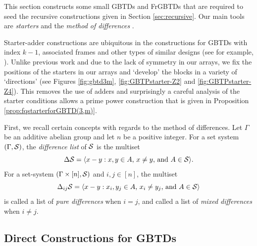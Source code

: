 \documentclass[draft, 11pt]{article}
\begin{document}
This section constructs some small GBTDs and FrGBTDs that are required to seed
the recursive constructions given in Section \ref{sec:recursive}. 
Our main tools are {\em starters} 
and the {\em method of differences} .

Starter-adder constructions are ubiquitous in the constructions for GBTDs with index $k-1$,
associated frames and other types of similar designs 
(see for example, \cite{Lamken:1992,Lamken:1994,Yinetal:2008,Cheeetal:2013b,Daietal:2013}).
Unlike previous work and due to the lack of symmetry in our arrays,
we fix the positions of the starters in our arrays and 
`develop' the blocks in a variety of `directions' (see Figures \ref{fig:gbtd3m}, \ref{fig:GBTPstarter-Z2} and \ref{fig:GBTPstarter-Z4}).
This removes the use of adders and 
surprisingly a careful analysis of the starter conditions
allows a prime power construction that is given in Proposition \ref{prop:fqstarterforGBTD(3,m)}.
 

 First, we recall certain concepts with regards to the method of differences.
 Let $\Gamma$ be an additive abelian group and let $n$ be a positive integer.
 For a set system $(\Gamma, \mathcal S)$, the {\em difference list} of
 $\mathcal S$ is the multiset
 \begin{equation*}
 \Delta\mathcal S = \langle x-y : \text{$x,y\in A$, $x\not=y$, and
 $A\in\mathcal S$} \rangle.
 \end{equation*}
 For a set-system $(\Gamma\times[n], \mathcal S)$ and $i,j\in [n]$, the multiset
 \begin{equation*}
 \Delta_{ij}\mathcal S = \langle x-y : \text{$x_i,y_j\in A$, $x_i\not=y_j$,
 and $A\in\mathcal S$}\rangle
 \end{equation*}
 is called a list of {\em pure differences} when $i=j$, and called a
 list of {\em mixed differences} when $i\not=j$.


\subsection{Direct Constructions for GBTDs}

\end{document}
